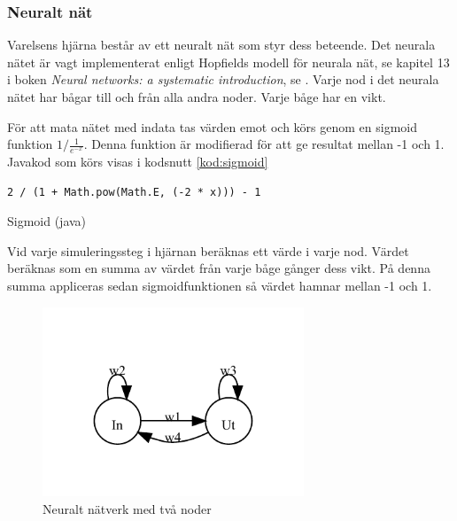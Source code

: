 \documentclass[titlepage, twocolumn, a4paper, 12pt]{article}
\begin{document}
\subsubsection{Neuralt nät}
Varelsens hjärna består av ett neuralt nät som styr dess beteende. Det neurala nätet är vagt implementerat enligt Hopfields modell för neurala nät, se kapitel 13 i boken \textit{Neural networks: a systematic introduction}, se \cite{raul}. Varje nod i det neurala nätet har bågar till och från alla andra noder. Varje båge har en vikt.

För att mata nätet med indata tas värden emot och körs genom en sigmoid funktion $1/\frac{1}{e^{-x}}$. Denna funktion är modifierad för att ge resultat mellan -1 och 1. Javakod som körs visas i kodsnutt \ref{kod:sigmoid}

\begin{kod}
\begin{footnotesize}
\begin{verbatim}
2 / (1 + Math.pow(Math.E, (-2 * x))) - 1
\end{verbatim}
\end{footnotesize}
\caption{Sigmoid (java)}\label{kod:sigmoid}
\end{kod}

Vid varje simuleringssteg i hjärnan beräknas ett värde i varje nod. Värdet beräknas som en summa av värdet från varje båge gånger dess vikt. På denna summa appliceras sedan sigmoidfunktionen så värdet hamnar mellan -1 och 1.

\begin{figure}[H]
  \begin{center}
    \includegraphics[width=78mm]{images/neuralnet.pdf}
    \caption{Neuralt nätverk med två noder}
    \label{fig:neuralnet.pdf}
  \end{center}
\end{figure}

\end{document}
